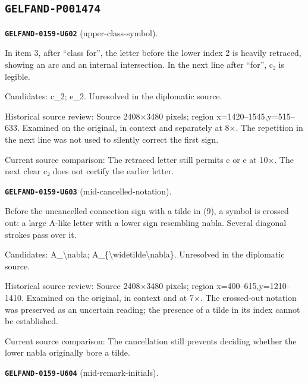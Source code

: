 \subsection*{\texttt{GELFAND-P001474}}
\par\noindent\leavevmode{}\label{GELFAND-0159-U602}\label{GELFAND-P001474:upper-class-symbol}\textbf{\texttt{GELFAND-0159-U602}} (upper-class-symbol).\nopagebreak[4]\par
In item 3, after “class for”, the letter before the lower index 2 is heavily retraced, showing an arc and an internal intersection. In the next line after “for”, c₂ is legible.\par
Candidates: c\_2; e\_2. Unresolved in the diplomatic source.\par
Historical source review: Source 2408×3480 pixels; region x=1420–1545,y=515–633. Examined on the original, in context and separately at 8×. The repetition in the next line was not used to silently correct the first sign.\par
Current source comparison: The retraced letter still permits c or e at 10×. The next clear c₂ does not certify the earlier letter.\par\medskip
\par\noindent\leavevmode{}\label{GELFAND-0159-U603}\label{GELFAND-P001474:mid-cancelled-notation}\textbf{\texttt{GELFAND-0159-U603}} (mid-cancelled-notation).\nopagebreak[4]\par
Before the uncancelled connection sign with a tilde in (9), a symbol is crossed out: a large A-like letter with a lower sign resembling nabla. Several diagonal strokes pass over it.\par
Candidates: A\_\textbackslash{}nabla; A\_\{\textbackslash{}widetilde\textbackslash{}nabla\}. Unresolved in the diplomatic source.\par
Historical source review: Source 2408×3480 pixels; region x=400–615,y=1210–1410. Examined on the original, in context and at 7×. The crossed-out notation was preserved as an uncertain reading; the presence of a tilde in its index cannot be established.\par
Current source comparison: The cancellation still prevents deciding whether the lower nabla originally bore a tilde.\par\medskip
\par\noindent\leavevmode{}\label{GELFAND-0159-U604}\label{GELFAND-P001474:mid-remark-initials}\textbf{\texttt{GELFAND-0159-U604}} (mid-remark-initials).\nopagebreak[4]\par
